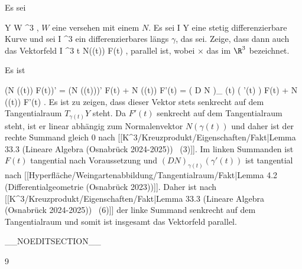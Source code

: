 {

Es sei

\mavergleichskette
{\vergleichskette
{ Y
}
{ \subseteq }{ W
}
{ \subseteq }{ \R^3
}
{    }{
}
{   }{
}
}
{}{}{,}
$W$
eine
versehen mit einem
$N$. Es sei
\maabb {\gamma} { I } { Y
} {}
eine stetig differenzierbare Kurve und sei
 { I } { \R^3
} {}
ein differenzierbares
längs $\gamma$, das
sei. Zeige, dass dann auch das Vektorfeld
\maabbeledisp {} { I } { \R^3
} { t } { N(\gamma(t)) \times F(t)
} {,}
parallel ist, wobei $\times$ das
im $\R^3$ bezeichnet.

}
{

Es ist

\mavergleichskettealign
{\vergleichskettealign
{ (N (\gamma(t)) \times F(t))'
}
{ =} { (N (\gamma(t)))' \times F(t) +  N (\gamma(t)) \times F'(t)
}
{ =} { \left(  D N   \right)_{ \gamma(t)} \left(   \gamma'(t)   \right)  \times F(t) +  N (\gamma(t)) \times F'(t)
}
{ } {
}
{ } {
}
}
{}
{}{.}
Es ist zu zeigen, dass dieser Vektor stets senkrecht auf dem Tangentialraum $T_{\gamma(t)}Y$ steht. Da $F'(t)$ senkrecht auf dem
Tangentialraum steht, ist er linear abhängig zum Normalenvektor $N (\gamma(t))$ und daher ist der rechte Summand gleich $0$ nach
[[K^3/Kreuzprodukt/Eigenschaften/Fakt|Lemma 33.3 (Lineare Algebra (Osnabrück 2024-2025))  (3)]].
Im linken Summanden ist $F(t)$ tangential nach Voraussetzung und $\left(  D N   \right)_{ \gamma(t)} \left(   \gamma'(t)   \right)$ ist tangential nach
[[Hyperfläche/Weingartenabbildung/Tangentialraum/Fakt|Lemma 4.2 (Differentialgeometrie (Osnabrück 2023))]].
Daher ist nach
[[K^3/Kreuzprodukt/Eigenschaften/Fakt|Lemma 33.3 (Lineare Algebra (Osnabrück 2024-2025))  (6)]]
der linke Summand senkrecht auf dem Tangentialraum und somit ist insgesamt das Vektorfeld parallel.

 }

__NOEDITSECTION__

{9}

